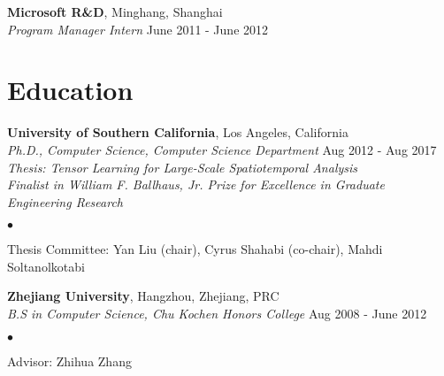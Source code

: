 \documentclass[margin,line]{res}
\newenvironment{list1}{
  \begin{list}{\ding{113}}{%
      \setlength{\itemsep}{0in}
      \setlength{\parsep}{0in} \setlength{\parskip}{0in}
      \setlength{\topsep}{0in} \setlength{\partopsep}{0in} 
      \setlength{\leftmargin}{0.17in}}}{\end{list}}
\newenvironment{list2}{
  \begin{list}{$\bullet$}{%
      \setlength{\itemsep}{0in}
      \setlength{\parsep}{0in} \setlength{\parskip}{0in}
      \setlength{\topsep}{0in} \setlength{\partopsep}{0in} 
      \setlength{\leftmargin}{0.2in}}}{\end{list}}
\begin{document}
\begin{resume}
{\bf  Microsoft R\&D}, Minghang, Shanghai\\
\vspace{-.2cm}
{\em Program Manager Intern} \hfill {June  2011 - June  2012}

\section{\sc Education}
{\bf University of Southern California}, Los Angeles, California\\
{\em Ph.D., Computer Science, Computer Science Department} \hfill {Aug 2012 - Aug 2017}\\
{\em Thesis: Tensor Learning for Large-Scale Spatiotemporal Analysis} \\
{\em Finalist in William F. Ballhaus, Jr. Prize for Excellence in Graduate Engineering Research}
\begin{list2}
\vspace*{.05in}
\item Thesis Committee:  Yan Liu (chair), Cyrus Shahabi (co-chair), Mahdi Soltanolkotabi
\end{list2}



{\bf Zhejiang University}, Hangzhou, Zhejiang, PRC\\
{\em B.S in Computer Science, Chu Kochen Honors College} \hfill {Aug 2008 - June 2012}
\begin{list2}
\vspace*{.05in}
\item Advisor:  Zhihua Zhang
\end{list2}


\end{resume}
\end{document}

